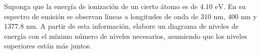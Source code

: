 \item Suponga que la energía de ionización de un cierto átomo es de $4.10\text{ eV}$. En su espectro de emisión se observan líneas a longitudes de onda de $310\text{ nm}$, $400\text{ nm}$ y $1377.8\text{ nm}$. A partir de esta información, elabore un diagrama de niveles de energía con el mínimo número de niveles necesarios, asumiendo que los niveles superiores están más juntos.